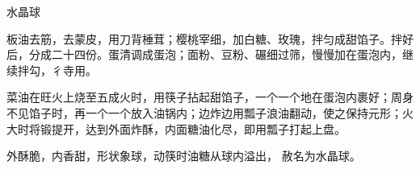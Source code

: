 \begin{recipe}{水晶球}

\ingredients


\cooking

\step 板油去筋，去蒙皮，用刀背棰茸；樱桃宰细，加白糖、玫瑰，拌匀成甜馅子。拌好后，分成二十四份。蛋清调成蛋泡；面粉、豆粉、碾细过筛，慢慢加在蛋泡内，继续拌勾，彳寺用。

\step 菜油在旺火上烧至五成火时，用筷子拈起甜馅子，一个一个地在蛋泡内裹好；周身不见馅子时，再一个一个放入油锅内；边炸边用瓢子浪油翻动，使之保持元形；火大时将锻提开，达到外面炸酥，内面糖油化尽，即用瓢子打起上盘。

\notes

外酥脆，内香甜，形状象球，动筷时油糖从球内溢出， 赦名为水晶球。

\end{recipe}

